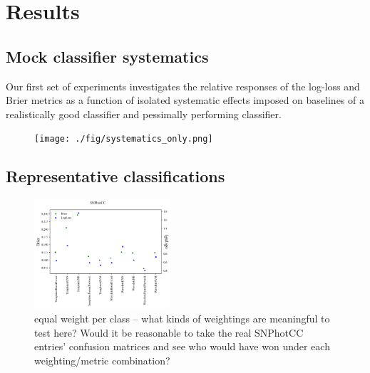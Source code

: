 \section{Results}
\label{sec:results}

\subsection{Mock classifier systematics}
\label{sec:mockresults}

Our first set of experiments investigates the relative responses of the log-loss and Brier metrics as a function of isolated systematic effects imposed on baselines of a realistically good classifier and pessimally performing classifier.

\begin{figure}
	\begin{center}
		\texttt{[image: ./fig/systematics\_only.png]}
		\caption{}
		\label{fig:plasticc_systematics}
	\end{center}
\end{figure}

\subsection{Representative classifications}
\label{sec:realresults}

\begin{figure}
	\begin{center}
		\includegraphics[width=0.45\textwidth]{./fig/SNPhotCC_res.png}
		\caption{equal weight per class -- what kinds of weightings are meaningful to test here?  Would it be reasonable to take the real SNPhotCC entries' confusion matrices and see who would have won under each weighting/metric combination?}
		\label{fig:real_metric_compare}
	\end{center}
\end{figure}

